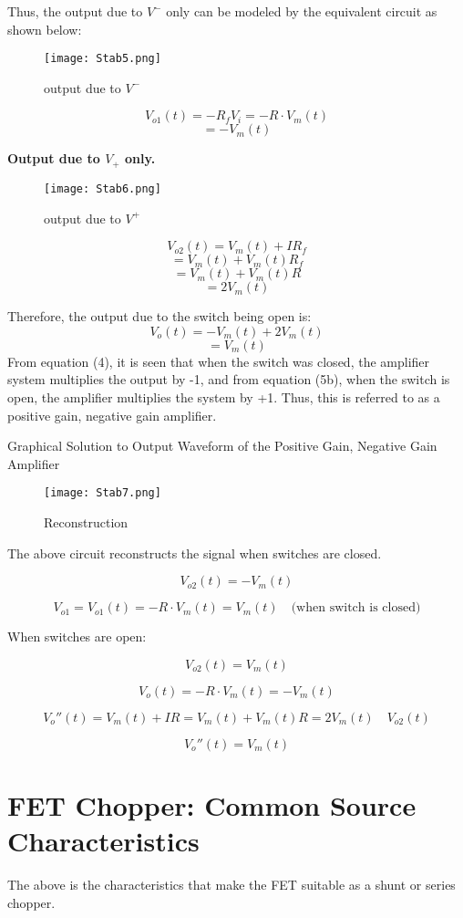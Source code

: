 \documentclass[a4paper,9pt,twoside,openany,twocolumn]{memoir}
\begin{document}
Thus, the output due to \( V^{-} \) only can be modeled by the equivalent circuit as shown below:


\begin{figure}[h]
    \centering
    \texttt{[image: Stab5.png]}
    \caption{output due to $V^{-}$}
\end{figure}
\[
V_{o1}(t) = -R_f V_i = -R \cdot V_m(t)
\]
\[
= -V_m(t) \tag{4}
\]

\textbf{Output due to \( V_{+} \) only.}
\begin{figure}[h]
    \centering
    \texttt{[image: Stab6.png]}
    \caption{output due to $V^{+}$}
\end{figure}
\[
V_{o2}(t) = V_m(t) + I R_f
\]
\[
= V_m(t) + V_m(t) R_f
\]
\[
= V_m(t) + V_m(t) R
\]
\[
= 2 V_m(t) \tag{5a}
\]

Therefore, the output due to the switch being open is:
\[
V_o(t) = - V_m(t) + 2 V_m(t)
\]
\[
= V_m(t) \tag{5b}
\]
From equation (4), it is seen that when the switch was closed, the amplifier system multiplies the output by -1, and from equation (5b), when the switch is open, the amplifier multiplies the system by +1. Thus, this is referred to as a positive gain, negative gain amplifier.

Graphical Solution to Output Waveform of the Positive Gain, Negative Gain Amplifier
\begin{figure}[h]
    \centering
    \texttt{[image: Stab7.png]}
    \caption{Reconstruction}
\end{figure} 

The above circuit reconstructs the signal when switches are closed.

\[
V_{o2}(t) = -V_m(t)
\]

\[
V_{o1} = V_{o1}(t) = - R \cdot V_m(t) = V_m(t) \quad \text{(when switch is closed)}
\]

When switches are open:

\[
V_{o2}(t) = V_m(t)
\]

\[
V_o(t) = -R \cdot V_m(t) = - V_m(t)
\]

\[
V_o''(t) = V_m(t) + IR = V_m(t) + V_m(t)R = 2 V_m(t) \quad V_{o2}(t)
\]

\[
V_o''(t) = V_m(t)
\]
\section{FET Chopper: Common Source Characteristics}

The above is the characteristics that make the FET suitable as a shunt or series chopper.
\end{document}
